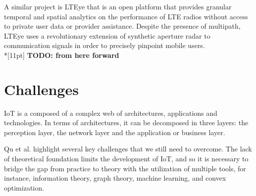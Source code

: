 \documentclass[conference]{IEEEtran}
\begin{document}
A similar project is LTEye \cite{KumarLTE} that is an open platform that provides
granular temporal and spatial analytics on the performance of LTE radios without
access to private user data or provider assistance. Despite the presence of multipath,
LTEye uses a revolutionary extension of synthetic aperture radar to communication
signals in order to precisely pinpoint mobile users.
\\*[11pt]
\textbf{TODO: from here forward}


\section{Challenges}

IoT is a composed of a complex web of architectures, applications and
technologies. In terms of architectures, it can be decomposed in three
layers: the perception layer, the network layer and the application or
business layer.

Qu et al. \cite{Qu2018Privacy} highlight several key challenges that we
still need to overcome. The lack of theoretical foundation limits the
development of IoT, and so it is necessary to bridge the gap from practice
to theory with the utilization of multiple tools, for instance, information
theory, graph theory, machine learning, and convex optimization.
\end{document}
